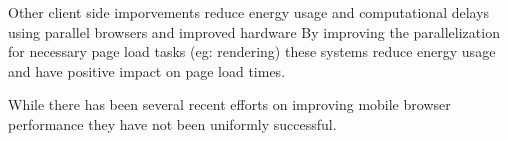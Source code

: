 Other client side imporvements reduce energy usage and computational delays using parallel
browsers \cite{mai2012hotpar, meyerovich2010www} %
and improved hardware \cite{zhu2013hpca} %
 By improving the parallelization 
for necessary page load tasks (eg: rendering) these systems reduce energy usage
and have positive impact on page load times. 

While there has been several recent efforts on improving mobile browser performance
they have not been uniformly successful.


